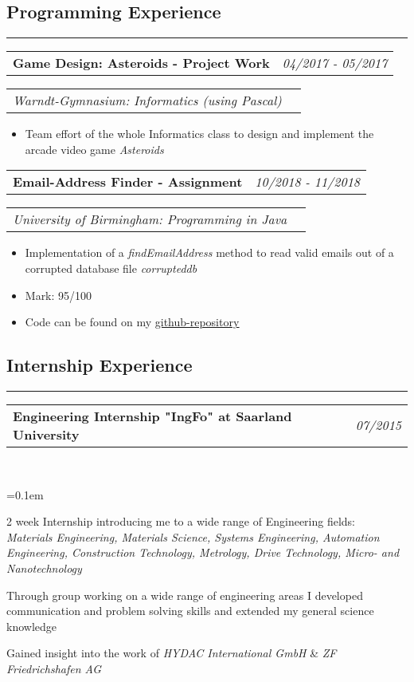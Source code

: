 \documentclass[10pt,letterpaper]{article}
\makeatletter
\newcommand{\headerrow}[2]
{\begin{tabular*}{\linewidth}{l@{\extracolsep{\fill}}r}
	#1 &
	#2 \\
\end{tabular*}}
\makeatother
\begin{document}
\subsection*{Programming Experience}
\hrule
\vspace{0.4em}

\noindent
\headerrow{\textbf{Game Design: Asteroids - Project Work}}{\emph{04/2017 - 05/2017}}
\headerrow{\emph{Warndt-Gymnasium: Informatics (using Pascal)}}{}
\vspace{-1.6em}
\begin{itemize}
    \setlength\itemsep{0em}
    \item Team effort of the whole Informatics class to design and implement the arcade video game \emph{Asteroids}
\end{itemize}

\noindent
\headerrow{\textbf{Email-Address Finder - Assignment}}{\emph{10/2018 - 11/2018}}
\headerrow{\emph{University of Birmingham: Programming in Java}}{}
\vspace{-1.6em}
\begin{itemize}
    \setlength\itemsep{0em}
    \item Implementation of a \emph{findEmailAddress} method to read valid emails out of a corrupted database file \emph{corrupteddb}
    \item Mark: 95/100
    \item Code can be found on my  \href{https://github.com/j0ner0n}{\underline{github-repository}}
\end{itemize}


\subsection*{Internship Experience}
\hrule
\vspace{0.4em}

\noindent
\headerrow{\textbf{Engineering Internship "IngFo" at Saarland University}}{\emph{07/2015}}
\\
\vspace{-1.6em}
\begin{itemize*}
    \parskip=0.1em
    \item 2 week Internship introducing me to a wide range of Engineering fields: \\
    \emph{Materials Engineering, Materials Science, Systems Engineering, Automation Engineering, Construction Technology, Metrology, Drive Technology, Micro- and Nanotechnology}
    \item Through group working on a wide range of engineering areas I developed communication and problem solving skills and extended my general science knowledge
    \item Gained insight into the work of \emph{HYDAC International GmbH} \& \emph{ZF Friedrichshafen AG}

\end{itemize*}
\end{document}
